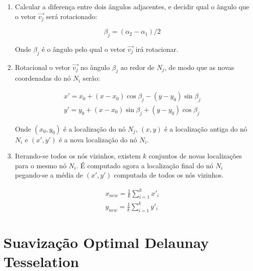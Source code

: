 \begin{enumerate}
    \item Calcular a diferença entre dois ângulos adjacentes, e decidir qual o ângulo que o vetor $\vec{v_j}$ será rotacionado:
    
    \begin{equation*}
        \beta_j = (\alpha_2 - \alpha_1) / 2
    \end{equation*}

    Onde $\beta_j$ é o ângulo pelo qual o vetor $\vec{v_j}$ irá rotacionar.

    \item Rotacional o vetor $\vec{v_j}$ no ângulo $\beta_j$ ao redor de $N_j$, de modo que as novas coordenadas do nó $N_i$ serão:
    
    \begin{equation*}
    \begin{split}
        x' = x_0 + (x-x_0) \cos{\beta_j} - (y-y_0) \sin{\beta_j}\\
        y' = y_0 + (x-x_0) \sin{\beta_j} + (y-y_0) \cos{\beta_j}
    \end{split}
    \end{equation*}

    Onde $(x_0, y_0)$ é a localização do nó $N_j$, $(x,y)$ é a localização antiga do nó $N_i$ e $(x', y')$ é a nova localização do nó $N_i$.

    \item Iterando-se todos os nós vizinhos, existem $k$ conjuntos de novas localizações para o mesmo nó $N_i$. É computado agora a localização final do nó $N_i$ pegando-se a média de $(x', y')$ computada de todos os nós vizinhos.
    
    \begin{equation*}
    \begin{split}
        x_{new} = \frac{1}{k} \sum_{i=1}^k x'_i\\
        y_{new} = \frac{1}{k} \sum_{i=1}^k y'_i
    \end{split}
    \end{equation*}
\end{enumerate}

\section{Suavização Optimal Delaunay Tesselation}

\cite{Chen2011}